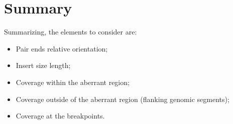 \section{Summary}
Summarizing, the elements to consider are:
 \begin{itemize}
 \item Pair ends relative orientation;
 \item Insert size length;
\item Coverage within the aberrant region;
\item Coverage outside of the aberrant region (flanking genomic segments);
\item Coverage at the breakpoints.
 \end{itemize}
